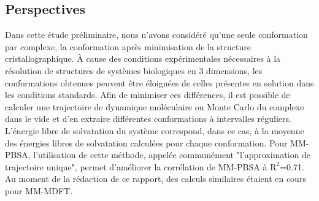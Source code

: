 \subsection{Perspectives}
Dans cette étude préliminaire, nous n'avons considéré qu'une seule conformation par complexe, la conformation après minimisation de la structure cristallographique. À cause des conditions expérimentales nécessaires à la résolution de structures de systèmes biologiques en 3 dimensions, les conformations obtenues peuvent être éloignées de celles présentes en solution dans les conditions standards. Afin de minimiser ces différences, il est possible de calculer une trajectoire de dynamique moléculaire ou Monte Carlo du complexe dans le vide et d'en extraire différentes conformations à intervalles réguliers. 
L'énergie libre de solvatation du système correspond, dans ce cas, à la moyenne des énergies libres de solvatation calculées pour chaque conformation. Pour MM-PBSA, l'utilisation de cette méthode, appelée communément "l'approximation de trajectoire unique", permet d'améliorer la corrélation de MM-PBSA à $\mathrm{R}^2$=0.71. Au moment de la rédaction de ce rapport, des calculs similaires étaient en cours pour MM-MDFT.



\clearpage
\strut
\vspace{10\baselineskip}




